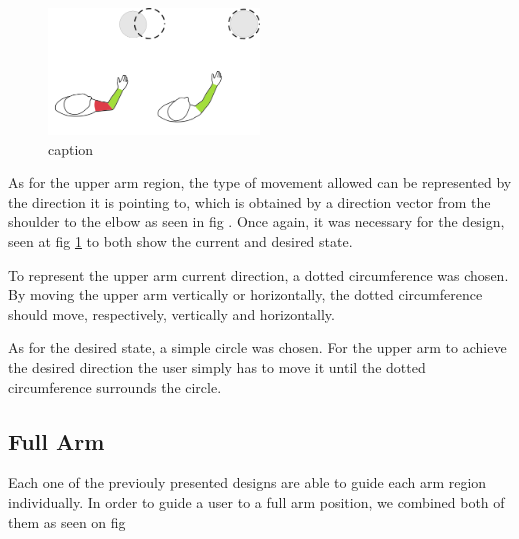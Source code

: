 \begin{figure}[!b]
    \begin{center}
        \includegraphics[width=0.5\textwidth]{imgs/upperarmfeedback.png}
    \end{center}
    \caption{caption}
    \label{fig:upperarmfeedback}
\end{figure}

As for the upper arm region, the type of movement allowed can be represented by the direction it is pointing to, which is obtained by a direction vector from the shoulder to the elbow as seen in fig .
Once again, it was necessary for the design, seen at fig \ref{fig:upperarmfeedback} to both show the current and desired state. 


To represent the upper arm current direction, a dotted circumference was chosen. By moving the upper arm vertically or horizontally, the dotted circumference should move, respectively, vertically and horizontally.


As for the desired state, a simple circle was chosen. For the upper arm to achieve the desired direction the user simply has to move it until the dotted circumference surrounds the circle.

\subsection{Full Arm}

Each one of the previouly presented designs are able to guide each arm region individually.
In order to guide a user to a full arm position, we combined both of them as seen on fig 

